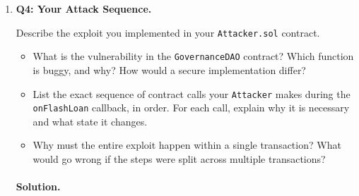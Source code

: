 \documentclass{article}
\begin{document}
\begin{enumerate}
    \paragraph{Solution.}

    \vspace{4em}

    \item \textbf{Q4: Your Attack Sequence.}

    Describe the exploit you implemented in your \texttt{Attacker.sol} contract.

    \begin{itemize}
        \item[(a)] What is the vulnerability in the \texttt{GovernanceDAO} contract? Which function is buggy, and why? How would a secure implementation differ?
        \item[(b)] List the exact sequence of contract calls your \texttt{Attacker} makes during the \texttt{onFlashLoan} callback, in order. For each call, explain why it is necessary and what state it changes.
        \item[(c)] Why must the entire exploit happen within a single transaction? What would go wrong if the steps were split across multiple transactions?
    \end{itemize}

    \paragraph{Solution.}

    \vspace{4em}

\end{enumerate}
\end{document}
